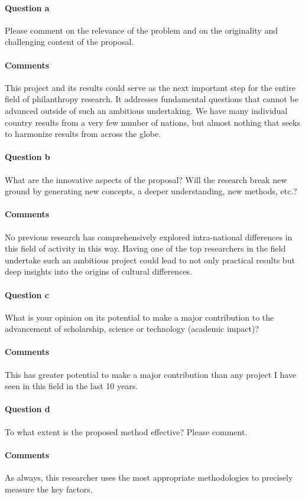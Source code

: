 \documentclass[twocolumn, serif, rga, numeric]{jote-article}
\begin{document}
\paragraph{Question a}
Please comment on the relevance of the problem and on the originality and challenging content of the proposal.
\paragraph{Comments}
This project and its results could serve as the next important step for the entire field of philanthropy research. It addresses fundamental questions that cannot be advanced outside of such an ambitious undertaking. We have many individual country results from a very few number of nations, but almost nothing that seeks to harmonize results from across the globe.
\paragraph{Question b}
What are the innovative aspects of the proposal? Will the research break new ground by generating new concepts, a deeper understanding, new methods, etc.?
\paragraph{Comments}
No previous research has comprehensively explored intra-national differences in this field of activity in this way. Having one of the top researchers in the field undertake such an ambitious project could lead to not only practical results but deep insights into the origins of cultural differences.
\paragraph{Question c}
What is your opinion on its potential to make a major contribution to the advancement of scholarship, science or technology (academic impact)?
\paragraph{Comments}
This has greater potential to make a major contribution than any project I have seen in this field in the last 10 years.
\paragraph{Question d}
To what extent is the proposed method effective? Please comment.
\paragraph{Comments}
As always, this researcher uses the most appropriate methodologies to precisely measure the key factors.
\end{document}

